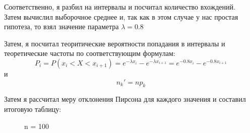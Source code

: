 \documentclass[a4paper,12pt, oneside]{book}
\begin{document}
Соответственно, я разбил на интервалы и посчитал количество вхождений.\\

Затем вычислил выборочное среднее и, так как в этом случае у нас простая гипотеза, то взял значение параметра $ \lambda = 0.8 $

Затем, я посчитал теоритические вероятности попадания в интервалы и теоретические частоты по соответствующим  формулам:\\
$$ 
P_i = P(x_i < X < x_{i+1}) = e^{-\lambda x_i} - e^{-\lambda x_{i+1}} = e^{-0.8 x_i} - e^{-0.8 x_{i+1}}
$$
и
$$
n_k' = n p_k 
$$  


Затем я рассчитал меру отклонения Пирсона для каждого значения и составил итоговую таблицу:

\begin{figure}[h!]
	\begin{center}
		\begin{minipage}[h]{0.47\linewidth}
			 n = 100 \\

\end{minipage}
\end{center}
\end{figure}
\end{document}
